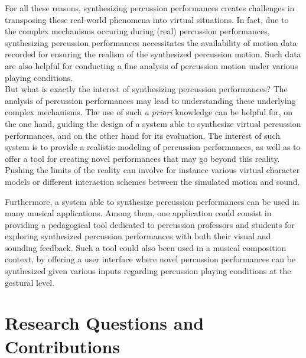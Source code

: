 For all these reasons, synthesizing percussion performances creates challenges in transposing these real-world phenomena into virtual situations. In fact, due to the complex mechanisms occuring during (real) percussion performances, synthesizing percussion performances necessitates the availability of motion data recorded for ensuring the realism of the synthesized percussion motion. Such data are also helpful for conducting a fine analysis of percussion motion under various playing conditions.\\

But what is exactly the interest of synthesizing percussion performances? The analysis of percussion performances may lead to understanding these underlying complex mechanisms. The use of such \emph{a priori} knowledge can be helpful for, on the one hand, guiding the design of a system able to synthesize virtual percussion performances, and on the other hand for its evaluation. The interest of such system is to provide a realistic modeling of percussion performances, as well as to offer a tool for creating novel performances that may go beyond this reality. Pushing the limits of the reality can involve for instance various virtual character models or different interaction schemes between the simulated motion and sound.

Furthermore, a system able to synthesize percussion performances can be used in many musical applications. Among them, one application could consist in providing a pedagogical tool dedicated to percussion professors and students for exploring synthesized percussion performances with both their visual and sounding feedback. Such a tool could also been used in a musical composition context, by offering a user interface where novel percussion performances can be synthesized given various inputs regarding percussion playing conditions at the gestural level. %




	\section{Research Questions and Contributions}

